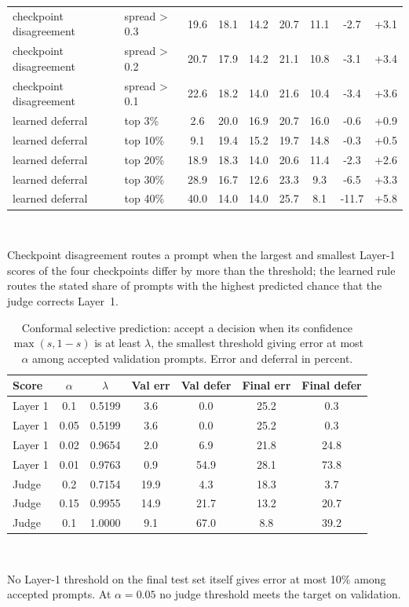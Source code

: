 \documentclass[journal]{IEEEtran}
\begin{document}
\begin{table}[!htbp]
\begin{tabular}{@{}llccccccc@{}}
checkpoint disagreement & spread > 0.3 & 19.6 & 18.1 & 14.2 & 20.7 & 11.1 & -2.7 & +3.1 \\
checkpoint disagreement & spread > 0.2 & 20.7 & 17.9 & 14.2 & 21.1 & 10.8 & -3.1 & +3.4 \\
checkpoint disagreement & spread > 0.1 & 22.6 & 18.2 & 14.0 & 21.6 & 10.4 & -3.4 & +3.6 \\
learned deferral & top 3\% & 2.6 & 20.0 & 16.9 & 20.7 & 16.0 & -0.6 & +0.9 \\
learned deferral & top 10\% & 9.1 & 19.4 & 15.2 & 19.7 & 14.8 & -0.3 & +0.5 \\
learned deferral & top 20\% & 18.9 & 18.3 & 14.0 & 20.6 & 11.4 & -2.3 & +2.6 \\
learned deferral & top 30\% & 28.9 & 16.7 & 12.6 & 23.3 & 9.3 & -6.5 & +3.3 \\
learned deferral & top 40\% & 40.0 & 14.0 & 14.0 & 25.7 & 8.1 & -11.7 & +5.8 \\
\bottomrule
\end{tabular}
\\[2pt]
\parbox{\linewidth}{\scriptsize Checkpoint disagreement routes a prompt when the largest and smallest Layer-1 scores of the four checkpoints differ by more than the threshold; the learned rule routes the stated share of prompts with the highest predicted chance that the judge corrects Layer~1.}
\end{table}

\setcounter{table}{12}
\begin{table}[!htbp]
\caption{Conformal selective prediction: accept a decision when its confidence $\max(s,1-s)$ is at least $\lambda$, the smallest threshold giving error at most $\alpha$ among accepted validation prompts. Error and deferral in percent.}
\label{abr:tab:conformal}
\centering
\scriptsize
\setlength{\tabcolsep}{3pt}
\begin{tabular}{@{}lcccccc@{}}
\toprule
Score & $\alpha$ & $\lambda$ & Val err & Val defer & Final err & Final defer \\
\midrule
Layer 1 & 0.1 & 0.5199 & 3.6 & 0.0 & 25.2 & 0.3 \\
Layer 1 & 0.05 & 0.5199 & 3.6 & 0.0 & 25.2 & 0.3 \\
Layer 1 & 0.02 & 0.9654 & 2.0 & 6.9 & 21.8 & 24.8 \\
Layer 1 & 0.01 & 0.9763 & 0.9 & 54.9 & 28.1 & 73.8 \\
\midrule
Judge & 0.2 & 0.7154 & 19.9 & 4.3 & 18.3 & 3.7 \\
Judge & 0.15 & 0.9955 & 14.9 & 21.7 & 13.2 & 20.7 \\
Judge & 0.1 & 1.0000 & 9.1 & 67.0 & 8.8 & 39.2 \\
\bottomrule
\end{tabular}
\\[2pt]
\parbox{\linewidth}{\scriptsize No Layer-1 threshold on the final test set itself gives error at most 10\% among accepted prompts. At $\alpha=0.05$ no judge threshold meets the target on validation.}
\end{table}
\end{document}
